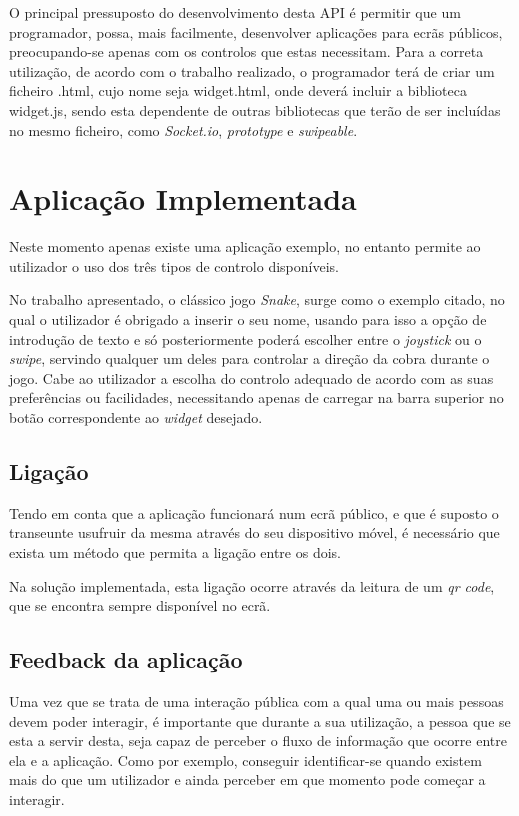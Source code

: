 	O principal pressuposto do desenvolvimento desta API é permitir que um programador, possa, mais facilmente, desenvolver aplicações para ecrãs públicos, preocupando-se apenas com os controlos que estas necessitam.
	Para a correta utilização, de acordo com o trabalho realizado, o programador terá de criar um ficheiro .html, cujo nome seja widget.html, onde deverá incluir a biblioteca widget.js, sendo esta dependente de outras bibliotecas que terão de ser incluídas no mesmo ficheiro, como \textit{Socket.io}, \textit{prototype} e \textit{swipeable}. 

	
\section{Aplicação Implementada} \label{sec:exemplo}

	Neste momento apenas existe uma aplicação exemplo, no entanto permite ao utilizador o uso dos três tipos de controlo disponíveis. 

	No trabalho apresentado, o clássico jogo \textit{Snake}, surge como o exemplo citado, no qual o utilizador é obrigado a inserir o seu nome, usando para isso a opção de introdução de texto e só posteriormente poderá escolher entre o \textit{joystick} ou o \textit{swipe}, servindo qualquer um deles para controlar a direção da cobra durante o jogo. Cabe ao utilizador a escolha do controlo adequado de acordo com as suas preferências ou facilidades, necessitando apenas de carregar na barra superior no botão correspondente ao \textit{widget} desejado.

	\subsection{Ligação}

	Tendo em conta que a aplicação funcionará num ecrã público, e que é suposto o transeunte usufruir da mesma através do seu dispositivo móvel, é necessário que exista um método que permita a ligação entre os dois.

	Na solução implementada, esta ligação ocorre através da leitura de um \textit{qr code}, que se encontra sempre disponível no ecrã.

	\subsection{Feedback da aplicação}

	Uma vez que se trata de uma interação pública com a qual uma ou mais pessoas devem poder interagir, é importante que durante a sua utilização, a pessoa que se esta a servir desta, seja capaz de perceber o fluxo de informação que ocorre entre ela e a aplicação. Como por exemplo, conseguir identificar-se quando existem mais do que um utilizador e ainda perceber em que momento pode começar a interagir.

